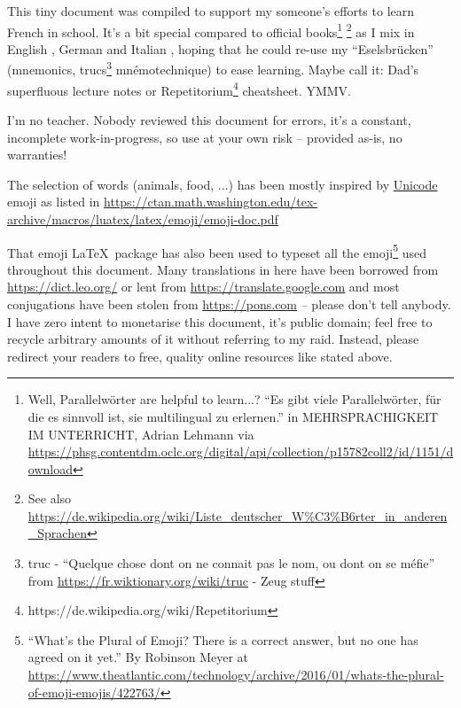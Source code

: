 This tiny document was compiled to support my someone's efforts to learn French\nolinebreak{} in school.
It's a bit special compared to official books\footnote{Well, Parallelwörter are helpful to learn...? ``Es gibt viele
Parallelwörter, für die es sinnvoll ist, sie multilingual zu erlernen.'' in MEHRSPRACHIGKEIT IM UNTERRICHT, Adrian Lehmann via
\url{https://phsg.contentdm.oclc.org/digital/api/collection/p15782coll2/id/1151/download}}
\footnote{See also \url{https://de.wikipedia.org/wiki/Liste_deutscher_W\%C3\%B6rter_in_anderen_Sprachen}}
as I mix in English , German  and Italian , hoping that he could re-use my ``Eselsbrücken''
(mnemonics, trucs\footnote{truc - ``Quelque chose dont on ne connait pas le nom, ou dont on se méfie'' from
\url{https://fr.wiktionary.org/wiki/truc} -  Zeug  stuff} mnémotechnique) to ease learning.
Maybe call it: Dad's superfluous lecture notes or Repetitorium\footnote{https://de.wikipedia.org/wiki/Repetitorium} cheatsheet. YMMV.

{\huge {} }

I'm no teacher. Nobody reviewed this document for errors, it's a constant, incomplete work-in-progress, so use at your own risk -- provided as-is, no warranties!

The selection of words (animals, food, ...) has been mostly inspired by
\href{https://twitter.com/unicode}{Unicode} emoji as listed in \url{https://ctan.math.washington.edu/tex-archive/macros/luatex/latex/emoji/emoji-doc.pdf}

That emoji \LaTeX\ package has also been used to typeset all the emoji\footnote{``What's the Plural of Emoji?
There is a correct answer, but no one has agreed on it yet.''
By Robinson Meyer at \url{https://www.theatlantic.com/technology/archive/2016/01/whats-the-plural-of-emoji-emojis/422763/}} used throughout this document.
Many translations in here have been borrowed from \url{https://dict.leo.org/} or lent from
\url{https://translate.google.com} and most conjugations have been stolen from \url{https://pons.com}
-- please don't tell anybody. I have zero intent to monetarise this document, it's public domain;
feel free to recycle arbitrary amounts of it without referring to my raid.
Instead, please redirect your readers to free, quality online resources like stated above.
